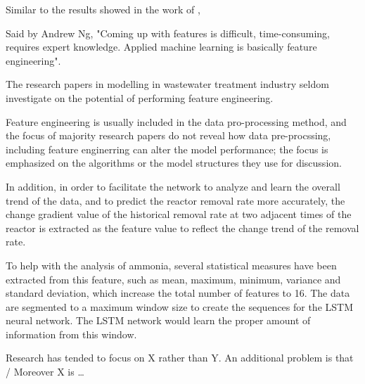 Similar to the results showed in the work of \citet{mamandipoorMonitoringDetectingFaults2020}, 


Said by Andrew Ng, "Coming up with features is difficult, time-consuming, requires expert knowledge. Applied machine learning is basically feature engineering". 


The research papers in modelling in wastewater treatment industry seldom investigate on the potential of performing feature engineering. 


\citep{patelWhatFeatureEngineering2021a}







Feature engineering is usually included in the data pro-processing method, and the focus of majority research papers do not reveal how data pre-procssing, including feature enginerring can alter the model performance; the focus is emphasized on the algorithms or the model structures they use for discussion. 


In addition, in order to facilitate the network to analyze and learn the overall trend of the data, and to predict the reactor removal rate more accurately, the change gradient value of the historical removal rate at two adjacent times of the reactor is extracted as the feature value to reflect the change trend of the removal rate. \citep{zaghloulDevelopmentEnsembleMachine2021}

To help with the analysis of ammonia, several statistical measures have been extracted from this feature, such as mean, maximum, minimum, variance and standard deviation, which increase the total number of features to 16. The data are segmented to a maximum window size to create the sequences for the LSTM neural network. The LSTM network would learn the proper amount of information from this window. \citep{mamandipoorMonitoringDetectingFaults2020}

Research has tended to focus on X rather than Y. An additional problem is that / Moreover X is …